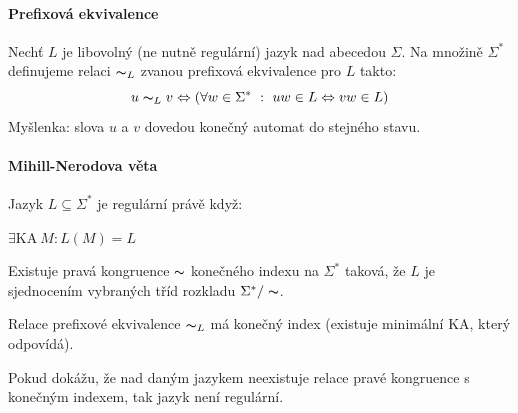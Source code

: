 \paragraph*{Prefixová ekvivalence} Nechť $L$ je libovolný (ne nutně regulární) jazyk nad abecedou $\Sigma$. Na množině $\Sigma^*$ definujeme relaci $\thicksim_L$ zvanou prefixová ekvivalence pro $L$ takto: $$ u \thicksim_L v \Leftrightarrow ( \forall w \in \Sigma^* ~:~ uw \in L \Leftrightarrow vw \in L )$$
Myšlenka: slova $u$ a $v$ dovedou konečný automat do stejného stavu.

\paragraph*{Mihill-Nerodova věta} Jazyk $L \subseteq \Sigma^*$ je regulární právě když: \begin{compactitem}
    \item $\exists \text{KA} ~ M : L(M) = L$
    \item Existuje pravá kongruence $\thicksim$ konečného indexu na $\Sigma^*$ taková, že $L$ je sjednocením vybraných tříd rozkladu $\Sigma^* / \thicksim$.
    \item Relace prefixové ekvivalence $\thicksim_L$ má konečný index (existuje minimální KA, který odpovídá).
\end{compactitem}

Pokud dokážu, že nad daným jazykem neexistuje relace pravé kongruence s konečným indexem, tak jazyk není regulární.
